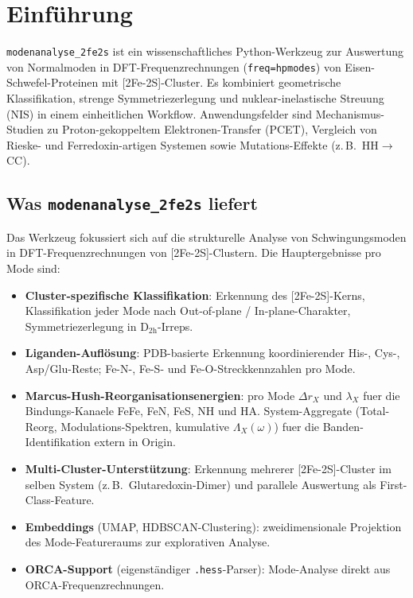 \documentclass[11pt,a4paper,twoside]{article}
\theoremstyle{remark}
\begin{document}
\section{Einf\"uhrung}
\label{sec:einleitung}

\texttt{modenanalyse\_2fe2s} ist ein wissenschaftliches Python-Werkzeug
zur Auswertung von Normalmoden in DFT-Frequenzrechnungen
(\texttt{freq=hpmodes}) von Eisen-Schwefel-Proteinen mit
{[}2Fe-2S{]}-Cluster. Es kombiniert geometrische Klassifikation,
strenge Symmetriezerlegung und nuklear-inelastische Streuung (NIS) in
einem einheitlichen Workflow. Anwendungsfelder sind Mechanismus-Studien
zu Proton-gekoppeltem Elektronen-Transfer (PCET), Vergleich von
Rieske- und Ferredoxin-artigen Systemen sowie Mutations-Effekte
(z.\,B.\ HH$\to$CC).

\subsection{Was \texttt{modenanalyse\_2fe2s} liefert}
\label{sec:scope}

Das Werkzeug fokussiert sich auf die strukturelle Analyse von
Schwingungsmoden in DFT-Frequenzrechnungen von [2Fe-2S]-Clustern.
Die Hauptergebnisse pro Mode sind:

\begin{itemize}
  \item \textbf{Cluster-spezifische Klassifikation}: Erkennung des
        {[}2Fe-2S{]}-Kerns, Klassifikation jeder Mode nach
        Out-of-plane / In-plane-Charakter, Symmetriezerlegung in
        D$_\mathrm{2h}$-Irreps.
  \item \textbf{Liganden-Aufl\"osung}: PDB-basierte Erkennung
        koordinierender His-, Cys-, Asp/Glu-Reste; Fe-N-, Fe-S- und
        Fe-O-Streckkennzahlen pro Mode.
  \item \textbf{Marcus-Hush-Reorganisationsenergien}: pro Mode
        $\Delta r_X$ und $\lambda_X$ fuer die Bindungs-Kanaele FeFe,
        FeN, FeS, NH und HA. System-Aggregate (Total-Reorg,
        Modulations-Spektren, kumulative $\Lambda_X(\omega)$) fuer
        die Banden-Identifikation extern in Origin.
  \item \textbf{Multi-Cluster-Unterst\"utzung}: Erkennung mehrerer
        {[}2Fe-2S{]}-Cluster im selben System (z.\,B.\ Glutaredoxin-Dimer)
        und parallele Auswertung als First-Class-Feature.
  \item \textbf{Embeddings} (UMAP, HDBSCAN-Clustering):
        zweidimensionale Projektion des Mode-Featureraums zur
        explorativen Analyse.
  \item \textbf{ORCA-Support} (eigenst\"andiger \texttt{.hess}-Parser):
        Mode-Analyse direkt aus ORCA-Frequenzrechnungen.
\end{itemize}
\end{document}

